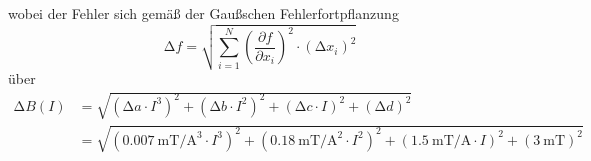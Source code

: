 wobei der Fehler sich gemäß der Gaußschen Fehlerfortpflanzung
\begin{equation}
  \increment f = \sqrt{ \sum_{i=1}^N \left( \frac{\partial f}{\partial x_i}\right)^2
  \cdot (\increment x_i)^2  }
  \label{eqn:gaus}
\end{equation}
über
\begin{equation}
  \begin{split}
  \increment B(I) &= \sqrt{ \left( \increment a \cdot I^3 \right)^2 + \left( \increment b \cdot I^2 \right)^2
  + \left( \increment c \cdot I \right)^2 + \left( \increment d \right)^2} \\\
  &= \sqrt{ \left( \SI{0.007}{\milli\tesla\per\cubic\ampere} \cdot I^3 \right)^2 +
  \left(  \SI{0.18}{\milli\tesla\per\square\ampere} \cdot I^2 \right)^2
  + \left( \SI{1.5}{\milli\tesla\per\ampere} \cdot I \right)^2 +
  \left( \SI{3}{\milli\tesla} \right)^2}
  \label{eqn:fbfeld}
\end{split}
\end{equation}

